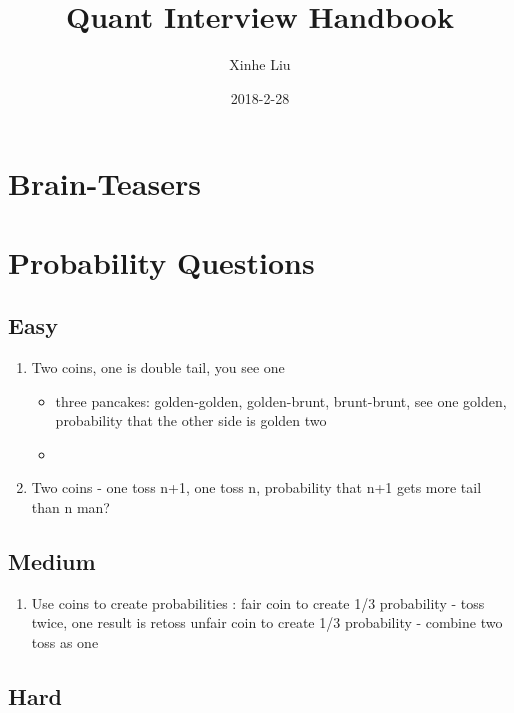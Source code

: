 \documentclass[11pt, openany]{book}              %
\title{\bf Quant Interview Handbook}    %
\author{Xinhe Liu}              %
\date{2018-2-28}                           %
\begin{document}
\maketitle                              %
\tableofcontents                        %
\mainmatter                             %


\chapter{Brain-Teasers}                %

\chapter{Probability Questions}

\section{Easy}
\begin{enumerate}
 \item Two coins, one is double tail, you see one \\
  \begin{itemize}
    \item three pancakes: golden-golden, golden-brunt, brunt-brunt, see one golden, probability that the other side is golden two
    \item 
   \end{itemize}
 \item Two coins - one toss n+1, one toss n, probability that n+1 gets more tail than n man?
\end{enumerate}


\section{Medium}
\begin{enumerate}
	\item Use coins to create probabilities : fair coin to create 1/3 probability - toss twice, one result is retoss
unfair coin to create 1/3 probability - combine two toss as one


 \end{enumerate}
 
\section{Hard}
\end{document}
